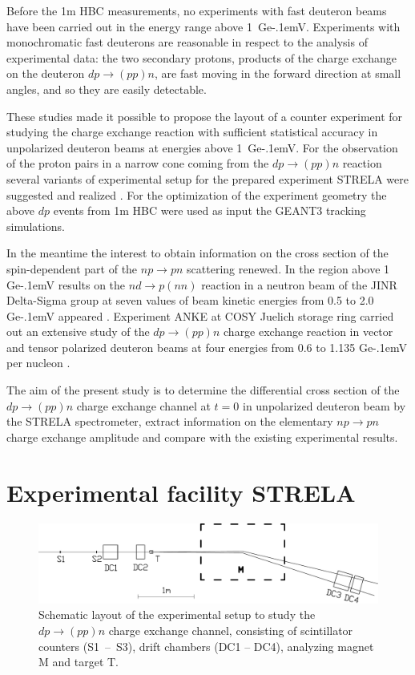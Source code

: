 \documentclass[twocolumn,epjc3]{svjour3}
\newcommand{\np}     {\ensuremath{np \rightarrow pn}\xspace}
\newcommand{\dpchex} {\ensuremath{dp \rightarrow (pp)n}\xspace}
\newcommand{\GeV}    {Ge\kern-.1emV\xspace}
\begin{document}
Before the 1m HBC measurements, no experiments with fast deuteron beams have
been carried out in the energy range above 1~\GeV. Experiments with
monochromatic fast deuterons are reasonable in respect to the analysis of
experimental data: the two secondary protons, products of the charge exchange on
the deuteron \dpchex, are fast moving in the forward direction at small angles,
and so they are easily detectable.

These studies made it possible to propose the layout of a counter experiment for
studying the charge exchange reaction with sufficient statistical accuracy in
unpolarized deuteron beams at energies above 1~\GeV. For the observation of the
proton pairs in a narrow cone coming from the \dpchex reaction several variants
of experimental setup for the prepared experiment STRELA were suggested and
realized \cite{gla13}. For the optimization of the experiment geometry the above
$dp$ events from 1m HBC were used as input the GEANT3 tracking simulations.

In the meantime the interest to obtain information on the cross section of the
spin-dependent part of the \np scattering renewed. In the region above 1 \GeV
results on the $nd \rightarrow p(nn)$ reaction in a neutron beam of the JINR
Delta-Sigma group at seven values of beam kinetic energies from 0.5 to 2.0 \GeV
appeared \cite{sha09,sha09_2,shi11}. Experiment ANKE at COSY Juelich storage
ring carried out an extensive study of the \dpchex charge exchange reaction in
vector and tensor polarized deuteron beams at four energies from 0.6 to 1.135
\GeV per nucleon \cite{chi09,mch13}.

The aim of the present study is to determine the differential cross section of
the \dpchex charge exchange channel at $t = 0$ in unpolarized deuteron beam by
the STRELA spectrometer, extract information on the elementary \np charge
exchange amplitude and compare with the existing experimental results.

\section{Experimental facility STRELA}

\begin{figure}[t] %
  \centering
  \includegraphics[width=1.00\textwidth]{STRELA_layout.pdf}
  \caption{Schematic layout of the experimental setup to study the \dpchex
    charge exchange channel, consisting of scintillator counters (S1~--~S3),
    drift chambers (DC1 -- DC4), analyzing magnet M and target T.}
  \label{fig:STRELA_layout}
\end{figure}
\end{document}
